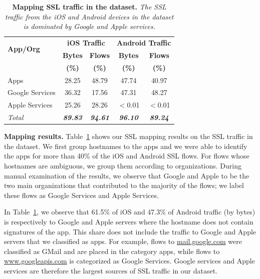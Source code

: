 \begin{table}
\centering
\begin{small}
\begin{tabular}{|p{}|c|c|c|c|}
\hline
\multirow{2}{*}{\bf App/Org} & \multicolumn{2}{c|}{\bf iOS Traffic} &  \multicolumn{2}{c|}{\bf Android Traffic} \tabularnewline
\cline{2-5}
                              & {\bf Bytes}  & {\bf Flows} & {\bf Bytes} & {\bf Flows}   \tabularnewline
                              & {\bf (\%)}  & {\bf (\%)} & {\bf (\%)} & {\bf (\%)}   \tabularnewline
\hline

Apps            & 28.25 & 48.79 & 47.74 & 40.97 \tabularnewline
\hline
Google Services & 36.32 & 17.56 & 47.31 & 48.27 \tabularnewline
\hline
Apple Services  & 25.26 & 28.26 & $<$0.01 & $<$0.01 \tabularnewline
\hline
{\emph{Total}}  & {\em \bf 89.83} & {\em\bf 94.61} & {\em\bf  96.10}  &  {\em\bf  89.24} \tabularnewline
\hline
\end{tabular}
\end{small}
\caption{\textbf{Mapping SSL traffic in the \mobWild dataset.} \emph{The SSL traffic from the iOS and Android devices in the \mobWild dataset is dominated by Google and Apple services.}}
\label{tab:classify-ssl-traffic}
\end{table}

\noindent\textbf{Mapping results.} 
Table~\ref{tab:classify-ssl-traffic} shows our SSL mapping results on the SSL traffic in the \mobWild dataset. 
We first group hostnames to the apps and we were able to identify the apps for more than 40\% of the iOS and Android SSL flows.
For flows whose hostnames are ambiguous, we group them according to organizations.
During manual examination of the results, we observe that Google and Apple to be the two main organizations that contributed to the majority of the flows; we label these flows as Google Services and Apple Services. 

In Table~\ref{tab:classify-ssl-traffic}, we observe that 61.5\% of iOS and 47.3\% of Android traffic (by bytes) is respectively 
to Google and Apple servers where the hostname does not contain signatures of the app.
This share does not include the traffic to Google and Apple servers that we classified as apps.
For example, flows to \url{mail.google.com} were classified as GMail and are placed in the category apps, while flows to \url{www.googleapis.com} is categorized as Google Services. 
Google services and Apple services are therefore the largest sources of SSL traffic in our \mobWild dataset.

